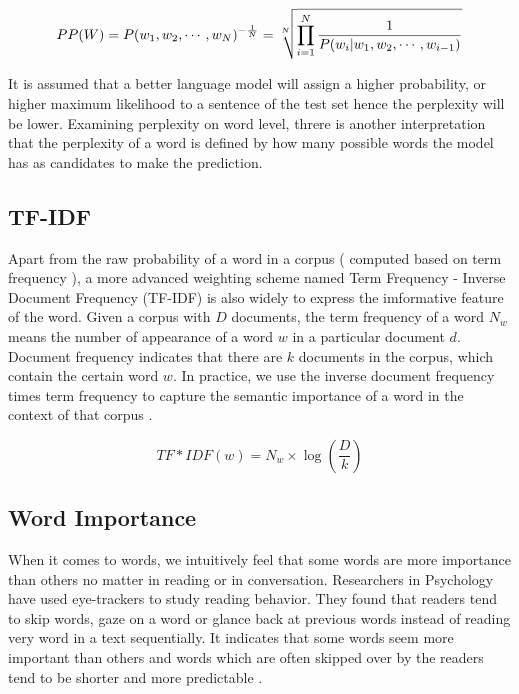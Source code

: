 \begin{equation}
PP(W) = P(w_1, w_2, \cdots, w_N)^{-\frac{1}{N}}\\
= \sqrt[N]{\prod_{i=1}^{N} \frac{1}{P(w_i|w_1, w_2,\cdots, w_{i-1})}}
\label{eq:perplexity}
\end{equation}

It is assumed that a better language model will assign a higher probability, or higher maximum likelihood to a sentence of the test set hence the perplexity will be lower. Examining perplexity on word level, threre is another interpretation that the perplexity of a word is defined by how many possible words the model has as candidates to make the prediction.

\subsection{TF-IDF}
Apart from the raw probability of a word in a corpus ( computed based on term frequency ), a more advanced weighting scheme named Term Frequency - Inverse Document Frequency (TF-IDF) is also widely to express the imformative feature of the word. Given a corpus with $D$ documents, the term frequency of a word $N_w$ means the number of appearance of a word $w$ in a particular document $d$. Document frequency indicates that there are $k$ documents in the corpus, which contain the certain word $w$. In practice, we use the inverse document frequency times term frequency to capture the semantic importance of a word in the context of that corpus \citep{Jurafsky2008}.

\begin{equation}
TF*IDF(w) = N_w \times \log(\frac{D}{k})
\label{eq:tf-idf}
\end{equation}


\subsection{Word Importance}
When it comes to words, we intuitively feel that some words are more importance than others no matter in reading or in conversation. Researchers in Psychology have used eye-trackers to study reading behavior. They found that readers tend to skip words, gaze on a word or glance back at previous words instead of reading very word in a text sequentially. It indicates that some words seem more important than others and words which are often skipped over by the readers tend to be shorter and more predictable \citep{Rayner2011}. 

